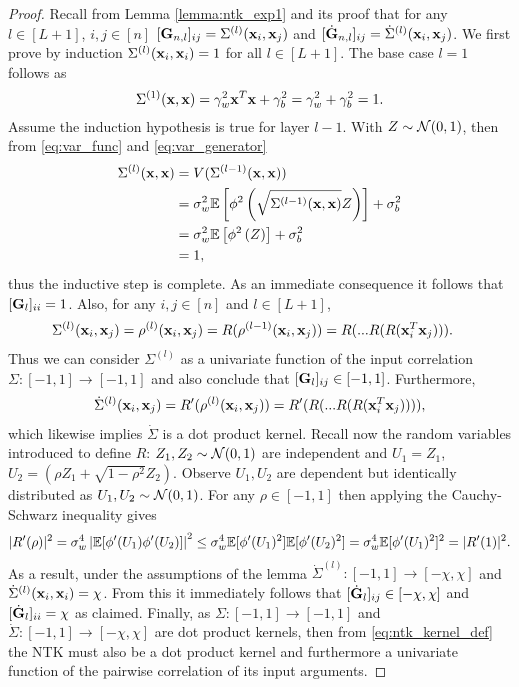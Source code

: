 \begin{proof}
    Recall from Lemma \ref{lemma:ntk_exp1} and its proof that for any $l \in [L+1]$, $i,j \in [n]$ $[\mathbf{G}_{n,l}]_{ij} = \Sigma^{(l)}(\mathbf x_i, \mathbf x_j)$ and $[\dot{\mathbf{G}}_{n,l}]_{ij} = \dot{\Sigma}^{(l)}(\mathbf x_i, \mathbf x_j)$. We first prove by induction $\Sigma^{(l)}(\mathbf x_i, \mathbf x_i) = 1$ for all $l \in [L+1]$. The base case $l=1$ follows as
    \[
    \Sigma^{(1)}(\mathbf x,\mathbf x) = \gamma_w^2 \mathbf x^T \mathbf x + \gamma_b^2 = \gamma_w^2 + \gamma_b^2 =1.
    \]
    Assume the induction hypothesis is true for layer $l-1$. With $Z \sim \mathcal{N}(0,1)$, then from \eqref{eq:var_func} and \eqref{eq:var_generator}
    \[
    \begin{aligned}
    \Sigma^{(l)}(\mathbf x, \mathbf x) &= V(\Sigma^{(l-1)}(\mathbf x,\mathbf x))\\
    & = \sigma_w^2 \mathbb{E}\left[\phi^2\left(\sqrt{\Sigma^{(l-1)}(\mathbf x, \mathbf x)}Z \right) \right] +  \sigma_b^2\\
    & = \sigma_w^2 \mathbb{E}\left[\phi^2\left(Z \right) \right] +  \sigma_b^2\\
    &=1,
    \end{aligned}
    \]
    thus the inductive step is complete. As an immediate consequence it follows that $[\mathbf{G}_{l}]_{ii}=1$.  Also, for any $i,j \in [n]$ and $l \in [L+1]$,
    \[
    \begin{aligned}
    \Sigma^{(l)}(\mathbf x_i,\mathbf x_j) &=\rho^{(l)}(\mathbf x_i,\mathbf x_j) = R(\rho^{(l-1)}(\mathbf x_i,\mathbf x_j))
    = R(...R(R(\mathbf x_i^T\mathbf x_j))).
    \end{aligned}
    \]
    Thus we can consider $\Sigma^{(l)}$ as a univariate function of the input correlation $\Sigma: [-1,1] \rightarrow [-1,1]$ and also conclude that $[\mathbf{G}_{l}]_{ij} \in [-1,1]$. Furthermore,
    \[
    \begin{aligned}
    \dot{\Sigma}^{(l)}(\mathbf x_i,\mathbf x_j) = R'(\rho^{(l)}(\mathbf x_i, \mathbf x_j)) = R'(R(...R(R(\mathbf x_i^T\mathbf x_j)))), 
    \end{aligned}
    \]
    which likewise implies $\dot{\Sigma}$ is a dot product kernel. Recall now the random variables introduced to define $R$: $Z_1, Z_2 \sim \mathcal{N}(0,1)$ are independent and $U_1 = Z_1$, $U_2 = (\rho Z_1 + \sqrt{1- \rho^2}Z_2)$. Observe $U_1, U_2$ are dependent but identically distributed as $U_1, U_2  \sim \mathcal{N}(0, 1)$. For any $\rho \in [-1,1]$ then applying the Cauchy-Schwarz inequality gives 
    \[
	\begin{aligned}
	|R'(\rho)|^2 = \sigma_w^4 \left| \mathbb{E}[\phi'(U_1) \phi'(U_2)] \right|^2
	\leq \sigma_w^4 \mathbb{E}[\phi'(U_1)^2] \mathbb{E}[\phi'(U_2)^2]
	 = \sigma_w^4 \mathbb{E}[\phi'(U_1)^2]^2 = |R'(1)|^2.
	\end{aligned}
	\]
	As a result, under the assumptions of the lemma $\dot{\Sigma}^{(l)}:[-1,1] \rightarrow [-\chi, \chi]$ and $\dot{\Sigma}^{(l)}(\mathbf x_i, \mathbf x_i) = \chi$. From this it immediately follows that $[\dot{\mathbf{G}}_{l}]_{ij} \in [-\chi,\chi]$ and $[\dot{\mathbf{G}}_{l}]_{ii}=\chi$ as claimed. Finally, as $\Sigma: [-1,1] \rightarrow [-1,1]$ and $\dot{\Sigma}: [-1,1] \rightarrow [-\chi,\chi]$ are dot product kernels, then from \eqref{eq:ntk_kernel_def} the NTK must also be a dot product kernel and furthermore a univariate function of the pairwise correlation of its input arguments.
\end{proof}

